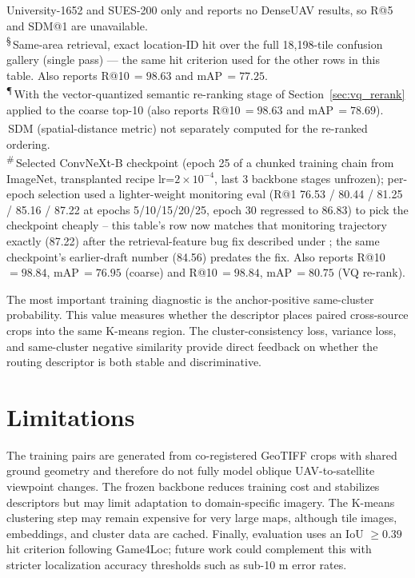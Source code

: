 \documentclass[conference]{IEEEtran}
\begin{document}
\begin{table}[htbp]
{University-1652 and SUES-200 only and reports no DenseUAV results, so R@5
and SDM@1 are unavailable.\\
\textsuperscript{\S}\,Same-area retrieval, exact location-ID hit over the full
18{,}198-tile confusion gallery (single pass) — the same hit criterion used for
the other rows in this table. Also reports R@10\,$=98.63$ and mAP\,$=77.25$.\\
\textsuperscript{\P}\,With the vector-quantized semantic re-ranking stage of
Section~\ref{sec:vq_rerank} applied to the coarse top-10 (also reports
R@10\,$=98.63$ and mAP\,$=78.69$).\\
\textsuperscript{\dag}\,SDM (spatial-distance metric) not separately computed
for the re-ranked ordering.\\
\textsuperscript{\#}\,Selected ConvNeXt-B checkpoint (epoch 25 of a chunked
training chain from ImageNet, transplanted recipe lr=$2\times10^{-4}$, last 3
backbone stages unfrozen); per-epoch selection used a lighter-weight
monitoring eval (R@1 76.53 / 80.44 / 81.25 / 85.16 / 87.22 at epochs
5/10/15/20/25, epoch 30 regressed to 86.83) to pick the checkpoint cheaply --
this table's row now matches that monitoring trajectory exactly (87.22)
after the retrieval-feature bug fix described under \ddag; the same
checkpoint's earlier-draft number (84.56) predates the fix. Also reports
R@10\,$=98.84$, mAP\,$=76.95$ (coarse) and R@10\,$=98.84$, mAP\,$=80.75$
(VQ re-rank).}
\end{table}

The most important training diagnostic is the anchor-positive same-cluster
probability. This value measures whether the descriptor places paired
cross-source crops into the same K-means region. The cluster-consistency loss,
variance loss, and same-cluster negative similarity provide direct feedback on
whether the routing descriptor is both stable and discriminative.

\section{Limitations}
\label{sec:limitations}
The training pairs are generated from co-registered GeoTIFF crops with shared
ground geometry and therefore do not fully model oblique UAV-to-satellite
viewpoint changes. The frozen backbone
reduces training cost and stabilizes descriptors but may limit adaptation to
domain-specific imagery. The K-means clustering step may remain
expensive for very large maps, although tile images, embeddings, and cluster
data are cached. Finally, evaluation uses an IoU $\geq 0.39$ hit criterion
following Game4Loc; future work could complement this with stricter
localization accuracy thresholds such as sub-10 m error rates.
\end{document}
